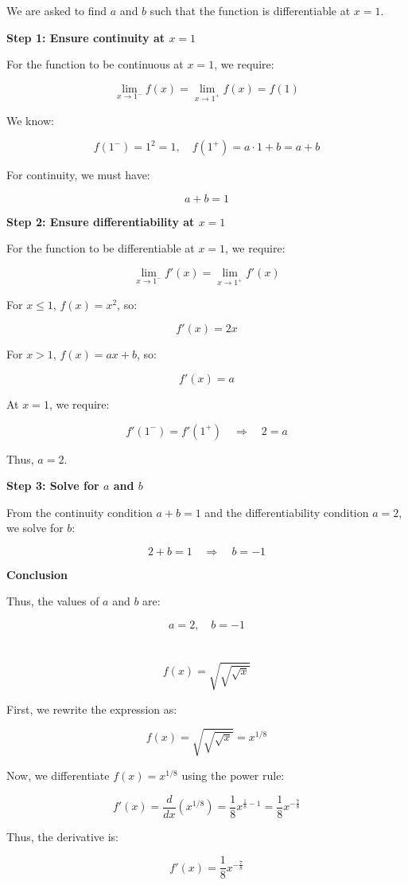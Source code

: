 \documentclass{article}
\begin{document}
We are asked to find \( a \) and \( b \) such that the function is differentiable at \( x = 1 \).

\textbf{Step 1: Ensure continuity at \( x = 1 \)}

For the function to be continuous at \( x = 1 \), we require:

\[
\lim_{x \to 1^-} f(x) = \lim_{x \to 1^+} f(x) = f(1)
\]

We know:

\[
f(1^-) = 1^2 = 1, \quad f(1^+) = a \cdot 1 + b = a + b
\]

For continuity, we must have:

\[
a + b = 1
\]

\textbf{Step 2: Ensure differentiability at \( x = 1 \)}

For the function to be differentiable at \( x = 1 \), we require:

\[
\lim_{x \to 1^-} f'(x) = \lim_{x \to 1^+} f'(x)
\]

For \( x \leq 1 \), \( f(x) = x^2 \), so:

\[
f'(x) = 2x
\]

For \( x > 1 \), \( f(x) = ax + b \), so:

\[
f'(x) = a
\]

At \( x = 1 \), we require:

\[
f'(1^-) = f'(1^+) \quad \Rightarrow \quad 2 = a
\]

Thus, \( a = 2 \).

\textbf{Step 3: Solve for \( a \) and \( b \)}

From the continuity condition \( a + b = 1 \) and the differentiability condition \( a = 2 \), we solve for \( b \):

\[
2 + b = 1 \quad \Rightarrow \quad b = -1
\]

\textbf{Conclusion}

Thus, the values of \( a \) and \( b \) are:

\[
a = 2, \quad b = -1
\]

\section{}
\subsection{}

\[
f(x) = \sqrt{\sqrt{\sqrt{x}}}
\]

First, we rewrite the expression as:

\[
f(x) = \sqrt{\sqrt{\sqrt{x}}} = x^{1/8}
\]

Now, we differentiate \( f(x) = x^{1/8} \) using the power rule:

\[
f'(x) = \frac{d}{dx} \left( x^{1/8} \right) = \frac{1}{8} x^{\frac{1}{8} - 1} = \frac{1}{8} x^{-\frac{7}{8}}
\]

Thus, the derivative is:

\[
f'(x) = \frac{1}{8} x^{-\frac{7}{8}}
\]
\end{document}
